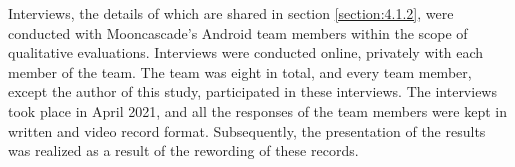 Interviews, the details of which are shared in section \ref{section:4.1.2}, were conducted with Mooncascade’s Android team members within the scope of qualitative evaluations. Interviews were conducted online, privately with each member of the team. The team was eight in total, and every team member, except the author of this study, participated in these interviews. The interviews took place in April 2021, and all the responses of the team members were kept in written and video record format. Subsequently, the presentation of the results was realized as a result of the rewording of these records.